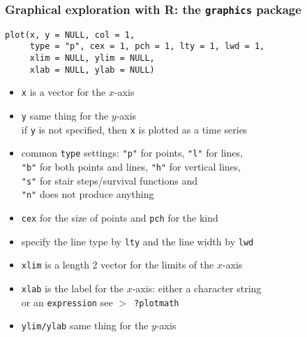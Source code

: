 \documentclass[11pt,pdftex,dvipsnames,usenames,helvetica]{beamer}
\begin{document}
\begin{frame}[fragile]
\frametitle{Graphical exploration with R: the {\tt graphics} package}
\begin{verbatim}
plot(x, y = NULL, col = 1, 
     type = "p", cex = 1, pch = 1, lty = 1, lwd = 1,
     xlim = NULL, ylim = NULL,
     xlab = NULL, ylab = NULL)
\end{verbatim}
\begin{itemize}
\item {\tt x} is a vector for the $x$-axis
\item {\tt y} same thing for the $y$-axis\\
if {\tt y} is not specified, then {\tt x} is plotted as a time series
\item common {\tt type} settings: {\tt "p"} for points, {\tt "l"} for lines,\\ 
{\tt "b"} for both points and lines, {\tt "h"} for vertical lines,\\
{\tt "s"} for stair steps/survival functions and\\ 
{\tt "n"} does not produce anything
\item {\tt cex} for the size of points and {\tt pch} for the kind
\item specify the line type by {\tt lty}
and the line width by {\tt lwd}
\item {\tt xlim} is a length 2 vector for the limits of the $x$-axis
\item {\tt xlab} is the label for the $x$-axis: 
either a character string\\ or an {\tt expression}
see {\tt $>$ ?plotmath}
\item {\tt ylim/ylab} same thing for the $y$-axis
\end{itemize}

\end{frame}
\end{document}
